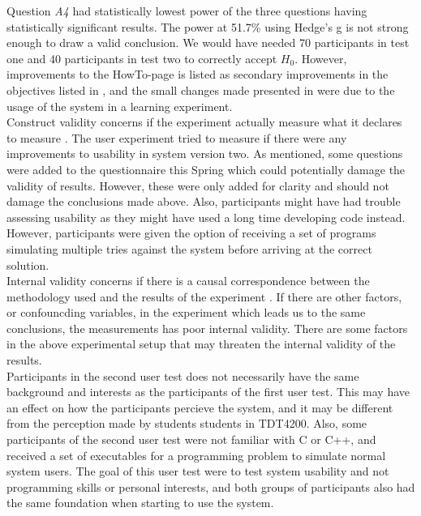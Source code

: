 Question \textit{A4} had statistically lowest power of the three questions having statistically significant results. The power at 51.7\% using Hedge's g is not strong enough to draw a valid conclusion. We would have needed 70 participants in test one and 40 participants in test two to correctly accept $H_0$. However, improvements to the HowTo-page is listed as secondary improvements in the objectives listed in , and the small changes made presented in  were due to the usage of the system in a learning experiment. \\

Construct validity concerns if the experiment actually measure what it declares to measure \cite{Cronbach1955}. The user experiment tried to measure if there were any improvements to usability in system version two. As mentioned, some questions were added to the questionnaire this Spring which could potentially damage the validity of results. However, these were only added for clarity and should not damage the conclusions made above. Also, participants might have had trouble assessing usability as they might have used a long time developing code instead. However, participants were given the option of receiving a set of programs simulating multiple tries against the system before arriving at the correct solution. \\

Internal validity concerns if there is a causal correspondence between the methodology used and the results of the experiment \cite{Oates2006}. If there are other factors, or confouncding variables, in the experiment which leads us to the same conclusions, the measurements has poor internal validity. There are some factors in the above experimental setup that may threaten the internal validity of the results. \\

Participants in the second user test does not necessarily have the same background and interests as the participants of the first user test. This may have an effect on how the participants percieve the system, and it may be different from the perception made by students students in TDT4200. Also, some participants of the second user test were not familiar with C or C++, and received a set of executables for a programming problem to simulate normal system users. The goal of this user test were to test system usability and not programming skills or personal interests, and both groups of participants also had the same foundation when starting to use the system.  \\

